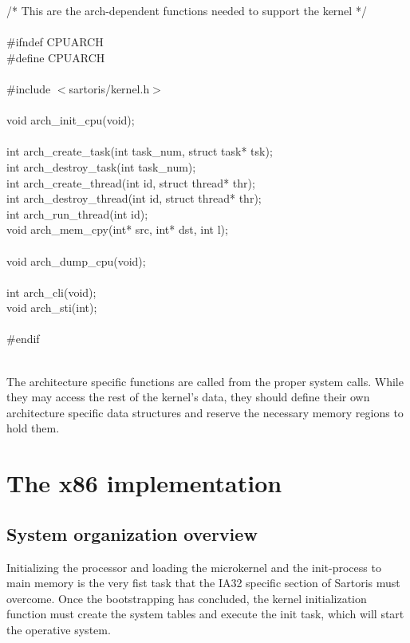 \documentclass[11pt, letterpaper, twoside, english]{book}
\begin{document}
\begin{sf} \noindent /* This are the arch-dependent functions needed to support the kernel */ \\
\\
\#ifndef CPUARCH \\
\#define CPUARCH \\
\\
\#include $<$sartoris/kernel.h$>$ \\
\\
void arch\_init\_cpu(void); \\
\\
int arch\_create\_task(int task\_num, struct task* tsk); \\
int arch\_destroy\_task(int task\_num); \\
int arch\_create\_thread(int id, struct thread* thr); \\
int arch\_destroy\_thread(int id, struct thread* thr); \\
int arch\_run\_thread(int id); \\
void arch\_mem\_cpy(int* src, int* dst, int l); \\
\\
void arch\_dump\_cpu(void); \\
\\
int arch\_cli(void); \\
void arch\_sti(int); \\
\\
\#endif \\
\end{sf}
\\
The architecture specific functions are called from the proper system calls. While they may access the rest of the kernel's data, they should define their own architecture specific data structures and reserve the necessary memory regions to hold them. 

\chapter{The x86 implementation}

\section{System organization overview}
Initializing the processor and loading the microkernel and the init-process to main memory is the very fist task that the IA32 specific section of Sartoris must overcome. Once the bootstrapping has concluded, the kernel initialization function must create the system tables and execute the init task, which will start the operative system. 
\end{document}
